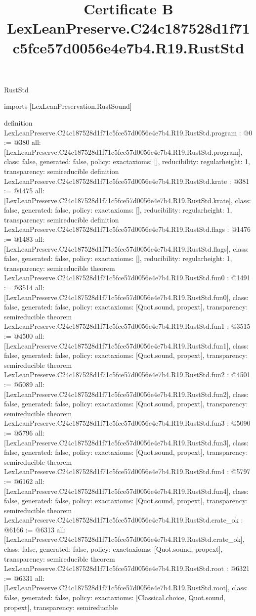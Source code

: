 \begin{lexlean}{RustStd}
\title{Certificate B LexLeanPreserve.C24c187528d1f71c5fce57d0056e4e7b4.R19.RustStd}
\begin{coremodule}
imports [LexLeanPreservation.RustSound]

definition LexLeanPreserve.C24c187528d1f71c5fce57d0056e4e7b4.R19.RustStd.program : @0 := @380 {
  all: [LexLeanPreserve.C24c187528d1f71c5fce57d0056e4e7b4.R19.RustStd.program],
  class: false,
  generated: false,
  policy: exact{axioms: []},
  reducibility: regular{height: 1},
  transparency: semireducible
}
definition LexLeanPreserve.C24c187528d1f71c5fce57d0056e4e7b4.R19.RustStd.krate : @381 := @1475 {
  all: [LexLeanPreserve.C24c187528d1f71c5fce57d0056e4e7b4.R19.RustStd.krate],
  class: false,
  generated: false,
  policy: exact{axioms: []},
  reducibility: regular{height: 1},
  transparency: semireducible
}
definition LexLeanPreserve.C24c187528d1f71c5fce57d0056e4e7b4.R19.RustStd.flags : @1476 := @1483 {
  all: [LexLeanPreserve.C24c187528d1f71c5fce57d0056e4e7b4.R19.RustStd.flags],
  class: false,
  generated: false,
  policy: exact{axioms: []},
  reducibility: regular{height: 1},
  transparency: semireducible
}
theorem LexLeanPreserve.C24c187528d1f71c5fce57d0056e4e7b4.R19.RustStd.fun0 : @1491 := @3514 {
  all: [LexLeanPreserve.C24c187528d1f71c5fce57d0056e4e7b4.R19.RustStd.fun0],
  class: false,
  generated: false,
  policy: exact{axioms: [Quot.sound, propext]},
  transparency: semireducible
}
theorem LexLeanPreserve.C24c187528d1f71c5fce57d0056e4e7b4.R19.RustStd.fun1 : @3515 := @4500 {
  all: [LexLeanPreserve.C24c187528d1f71c5fce57d0056e4e7b4.R19.RustStd.fun1],
  class: false,
  generated: false,
  policy: exact{axioms: [Quot.sound, propext]},
  transparency: semireducible
}
theorem LexLeanPreserve.C24c187528d1f71c5fce57d0056e4e7b4.R19.RustStd.fun2 : @4501 := @5089 {
  all: [LexLeanPreserve.C24c187528d1f71c5fce57d0056e4e7b4.R19.RustStd.fun2],
  class: false,
  generated: false,
  policy: exact{axioms: [Quot.sound, propext]},
  transparency: semireducible
}
theorem LexLeanPreserve.C24c187528d1f71c5fce57d0056e4e7b4.R19.RustStd.fun3 : @5090 := @5796 {
  all: [LexLeanPreserve.C24c187528d1f71c5fce57d0056e4e7b4.R19.RustStd.fun3],
  class: false,
  generated: false,
  policy: exact{axioms: [Quot.sound, propext]},
  transparency: semireducible
}
theorem LexLeanPreserve.C24c187528d1f71c5fce57d0056e4e7b4.R19.RustStd.fun4 : @5797 := @6162 {
  all: [LexLeanPreserve.C24c187528d1f71c5fce57d0056e4e7b4.R19.RustStd.fun4],
  class: false,
  generated: false,
  policy: exact{axioms: [Quot.sound, propext]},
  transparency: semireducible
}
theorem LexLeanPreserve.C24c187528d1f71c5fce57d0056e4e7b4.R19.RustStd.crate_ok : @6166 := @6313 {
  all: [LexLeanPreserve.C24c187528d1f71c5fce57d0056e4e7b4.R19.RustStd.crate_ok],
  class: false,
  generated: false,
  policy: exact{axioms: [Quot.sound, propext]},
  transparency: semireducible
}
theorem LexLeanPreserve.C24c187528d1f71c5fce57d0056e4e7b4.R19.RustStd.root : @6321 := @6331 {
  all: [LexLeanPreserve.C24c187528d1f71c5fce57d0056e4e7b4.R19.RustStd.root],
  class: false,
  generated: false,
  policy: exact{axioms: [Classical.choice, Quot.sound, propext]},
  transparency: semireducible
}


\end{coremodule}
\end{lexlean}
